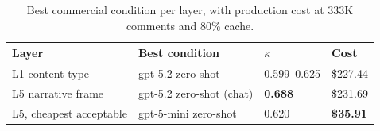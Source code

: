 \begin{table}[h]
  \caption{Best commercial condition per layer, with production cost at 333K
    comments and 80\% cache.}
  \label{tab:commercial}
  \small
  \begin{tabular}{@{}llll@{}}
    \toprule
    Layer & Best condition & $\kappa$ & Cost \\
    \midrule
    L1 content type & gpt-5.2 zero-shot & 0.599--0.625 & \$227.44 \\
    L5 narrative frame & gpt-5.2 zero-shot (chat) & \textbf{0.688} & \$231.69 \\
    L5, cheapest acceptable & gpt-5-mini zero-shot & 0.620 & \textbf{\$35.91} \\
    \bottomrule
  \end{tabular}
\end{table}
